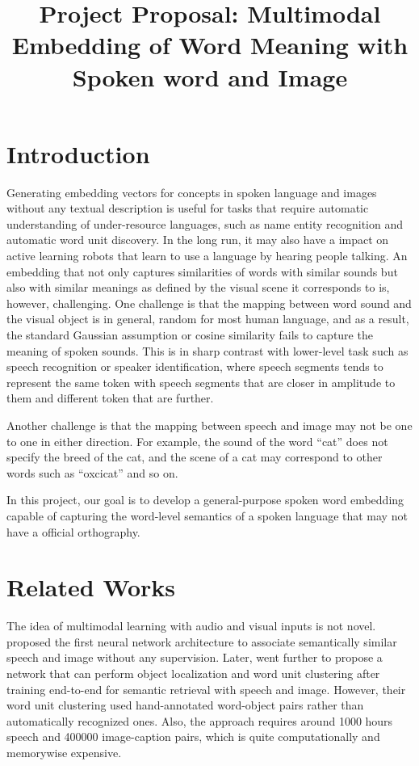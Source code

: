\documentclass[a4paper]{article}
\title{Project Proposal: Multimodal Embedding of Word Meaning with Spoken word and Image}
\begin{document}
\maketitle
\section{Introduction}
Generating embedding vectors for concepts in spoken 
language
and images
without any textual description is useful for tasks
that require automatic understanding of under-resource languages, such as name entity recognition and
automatic word unit discovery. In the long run, it
may also have a impact on active learning robots that
learn to use a language by hearing people talking.
An embedding that not only
captures similarities of words with similar sounds but also with 
similar meanings as defined by the visual scene it 
corresponds to is, however, challenging. One challenge
is that the mapping between word sound and the
visual object is in general, random for most human
language, and as a result, the standard Gaussian 
assumption or cosine similarity fails to capture the
 meaning of spoken sounds. This is in sharp contrast
 with lower-level task such as speech recognition
 or speaker identification, where
 speech segments tends to represent the same
 token with speech segments that are closer in amplitude to them and different token that are further. 
 
 Another challenge is that the mapping between speech
 and image may not be one to one in either direction.
 For example, the sound of the word ``cat'' does not specify the
 breed of the cat, and the scene of a cat
 may correspond to other words such as ``oxcicat'' and so on.
 
 In this project, our goal is to develop a 
 general-purpose spoken word embedding capable of capturing the
 word-level semantics of a spoken language that may
 not have a official orthography.
 
\section{Related Works}
The idea of multimodal learning with audio and
visual inputs is not
novel. \cite{Harwath16-ULO} proposed the first 
neural network architecture to associate semantically similar speech 
and image without any supervision. Later, \cite{Harwath18} went further to propose a
network that can perform object localization 
and word unit clustering after training end-to-end for semantic retrieval with speech
and image. However, their word unit clustering
used hand-annotated word-object pairs rather
than automatically recognized ones. Also, the 
approach requires around 1000 hours speech and
400000 image-caption pairs, which is quite 
computationally and memorywise expensive.
\end{document}
